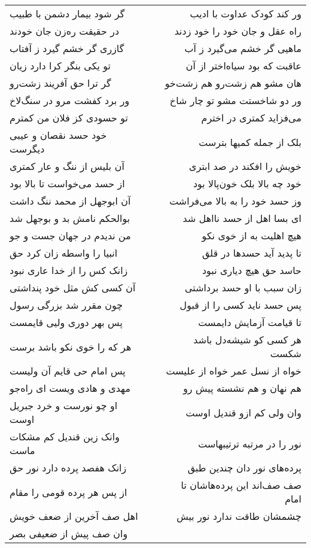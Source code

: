 \begin{center}
\begin{longtable}{l p{0.5cm} r}
گر شود بیمار دشمن با طبیب
&&
ور کند کودک عداوت با ادیب
\\
در حقیقت ره‌زن جان خودند
&&
راه عقل و جان خود را خود زدند
\\
گازری گر خشم گیرد ز آفتاب
&&
ماهیی گر خشم می‌گیرد ز آب
\\
تو یکی بنگر کرا دارد زیان
&&
عاقبت که بود سیاه‌اختر از آن
\\
گر ترا حق آفریند زشت‌رو
&&
هان مشو هم زشت‌رو هم زشت‌خو
\\
ور برد کفشت مرو در سنگ‌لاخ
&&
ور دو شاخستت مشو تو چار شاخ
\\
تو حسودی کز فلان من کمترم
&&
می‌فزاید کمتری در اخترم
\\
خود حسد نقصان و عیبی دیگرست
&&
بلک از جمله کمیها بترست
\\
آن بلیس از ننگ و عار کمتری
&&
خویش را افکند در صد ابتری
\\
از حسد می‌خواست تا بالا بود
&&
خود چه بالا بلک خون‌پالا بود
\\
آن ابوجهل از محمد ننگ داشت
&&
وز حسد خود را به بالا می‌فراشت
\\
بوالحکم نامش بد و بوجهل شد
&&
ای بسا اهل از حسد نااهل شد
\\
من ندیدم در جهان جست و جو
&&
هیچ اهلیت به از خوی نکو
\\
انبیا را واسطه زان کرد حق
&&
تا پدید آید حسدها در قلق
\\
زانک کس را از خدا عاری نبود
&&
حاسد حق هیچ دیاری نبود
\\
آن کسی کش مثل خود پنداشتی
&&
زان سبب با او حسد برداشتی
\\
چون مقرر شد بزرگی رسول
&&
پس حسد ناید کسی را از قبول
\\
پس بهر دوری ولیی قایمست
&&
تا قیامت آزمایش دایمست
\\
هر که را خوی نکو باشد برست
&&
هر کسی کو شیشه‌دل باشد شکست
\\
پس امام حی قایم آن ولیست
&&
خواه از نسل عمر خواه از علیست
\\
مهدی و هادی ویست ای راه‌جو
&&
هم نهان و هم نشسته پیش رو
\\
او چو نورست و خرد جبریل اوست
&&
وان ولی کم ازو قندیل اوست
\\
وانک زین قندیل کم مشکات ماست
&&
نور را در مرتبه ترتیبهاست
\\
زانک هفصد پرده دارد نور حق
&&
پرده‌های نور دان چندین طبق
\\
از پس هر پرده قومی را مقام
&&
صف صف‌اند این پرده‌هاشان تا امام
\\
اهل صف آخرین از ضعف خویش
&&
چشمشان طاقت ندارد نور بیش
\\
وان صف پیش از ضعیفی بصر

\end{longtable}
\end{center}

